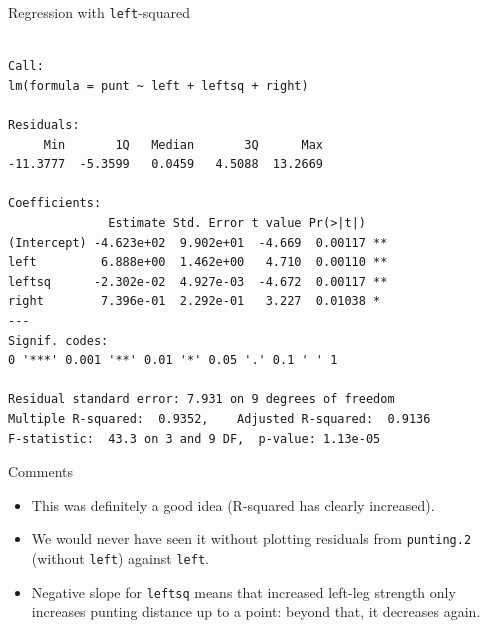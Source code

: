 \begin{frame}[fragile]{Regression with \texttt{left}-squared}
  
  {\footnotesize
\begin{knitrout}
\color{fgcolor}\begin{kframe}
\begin{alltt}
\end{alltt}
\begin{verbatim}

Call:
lm(formula = punt ~ left + leftsq + right)

Residuals:
     Min       1Q   Median       3Q      Max 
-11.3777  -5.3599   0.0459   4.5088  13.2669 

Coefficients:
              Estimate Std. Error t value Pr(>|t|)   
(Intercept) -4.623e+02  9.902e+01  -4.669  0.00117 **
left         6.888e+00  1.462e+00   4.710  0.00110 **
leftsq      -2.302e-02  4.927e-03  -4.672  0.00117 **
right        7.396e-01  2.292e-01   3.227  0.01038 * 
---
Signif. codes:  
0 '***' 0.001 '**' 0.01 '*' 0.05 '.' 0.1 ' ' 1

Residual standard error: 7.931 on 9 degrees of freedom
Multiple R-squared:  0.9352,	Adjusted R-squared:  0.9136 
F-statistic:  43.3 on 3 and 9 DF,  p-value: 1.13e-05
\end{verbatim}
\end{kframe}
\end{knitrout}
}

  
\end{frame}

\begin{frame}[fragile]{Comments}
  
\begin{itemize}
\item This was definitely a good idea (R-squared has clearly increased).
\item We would never have seen it without plotting residuals from
  \texttt{punting.2} (without \texttt{left}) against \texttt{left}.
\item Negative slope for \texttt{leftsq} means that increased left-leg
  strength only increases punting distance up to a point: beyond that,
  it decreases again.
\end{itemize}
  
  
\end{frame}
